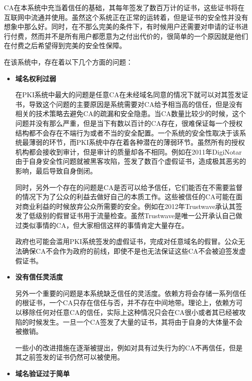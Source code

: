 CA在本系统中充当着信任的基础，其每年签发了数百万计的证书，这些证书将在互联网中流通并使用。虽然这个系统正在正常的运转着，但是证书的安全性并没有想象中那么好。同时，在不那么完美的条件下，有时候用户还需要对申请的证书进行付费，然而并不是所有用户都愿意为之付出代价的，很简单的一个原因就是他们在付费之后希望得到完美的安全性保障。

在该系统中，存在着以下几个方面的问题\cite{ristic2014bulletproof}：


\begin{itemize}
	\item

	\noindent\textbf{域名权利过弱}

	在PKI系统中最大的问题是任意CA在未经域名同意的情况下就可以对其签发证书，导致这个问题的主要原因是系统需要对CA给予相当高的信任，但是没有相关的技术策略去避免CA的疏漏和安全隐患。当CA数量比较少的时候，这个问题并没有那么严重，但是当下有数以百计的CA存在，很难保证每一个授权结构都不会存在不端行为或者不当的安全配置。一个系统的安全性取决于该系统最薄弱的环节，而PKI系统中存在着各种潜在的薄弱环节。虽然所有的授权机构都会接收到审计，但是审计的质量却各不相同。例如在2011年DigiNotar由于自身安全性问题就被黑客攻陷，签发了数百个虚假证书，造成极其恶劣的影响，最后导致自身倒闭。

	同时，另外一个存在的问题是CA是否可以给予信任，它们能否在不需要监督的情况下为了公众的利益去做好自己的本质工作。这些被信任的CA可能在面对商业利益的时候放弃公众所需要的安全。例如在2012年Trustwave承认其签发了低级别的假冒证书用于流量检查。虽然Trustwave是唯一公开承认自己做过类似事情的CA，但大家相信这样的事情肯定大量存在。

	政府也可能会滥用PKI系统签发的虚假证书，完成对任意域名的假冒。公众无法确保CA不会作为政府的前线，即使不是也无法保证这些CA不会被迫签发虚假证书。



	\item

	\noindent\textbf{没有信任灵活度}

	另外一个重要的问题是本系统缺乏信任的灵活度。依赖方将会存储一系列信任的根证书，一个CA只存在信任与否，并不存在中间地带。理论上，依赖方可以移除任何对任意CA的信任，实际上这种情况只会在CA很小或者其已经被攻陷的时候发生。一旦一个CA签发了大量的证书，其将由于自身的大体量不会被撤销。

	一些小的改进措施在逐渐被提出，例如对具有过失行为的CA不再信任，但是其之前签发的证书仍然可以被使用。

	\item

	\noindent\textbf{域名验证过于简单}


\end{itemize}
